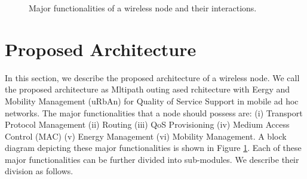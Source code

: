 \documentclass[10pt,times,epsfig,psfig,twocolumn,algorithm,algorithmic]{IEEEtran}
\begin{document}
\begin{figure}
\centerline{}
\caption{Major functionalities of a wireless node and their interactions.}
\label{major-func}
\end{figure}
 
\section{Proposed Architecture}
In this section, we describe the proposed architecture of a wireless node. We call the proposed architecture as Mltipath outing ased rchitecture with Eergy and Mobility Management (uRbAn) for Quality of Service Support in mobile ad hoc networks.  The major functionalities that a node should possess are: (i) Transport Protocol Management (ii) Routing (iii) QoS Provisioning (iv) Medium Access Control (MAC)  (v) Energy Management (vi) Mobility Management. A block diagram depicting these major functionalities is shown in Figure \ref{major-func}. Each of these major functionalities can be further divided into sub-modules. We describe their division as follows.
\end{document}
